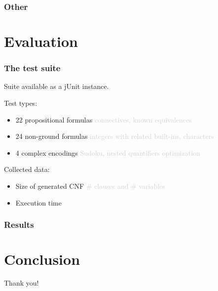 \documentclass[smaller,dvipsnames]{beamer}
\begin{document}
  \begin{frame}
    \frametitle{Other}
  \end{frame}

  \section{Evaluation}

  \begin{frame}
    \frametitle{The test suite}
    Suite available as a \alert{jUnit} instance.

    Test types:
    \begin{itemize}
      \item 22 propositional formulas \textcolor{lightgray}{connectives, known equivalences}
      \item 24 non-ground formulas \textcolor{lightgray}{integers with related built-ins, characters}
      \item 4 complex encodings \textcolor{lightgray}{Sudoku, nested quantifiers optimization}
    \end{itemize}
    Collected data:
    \begin{itemize}
      \item \alert{Size} of generated CNF \textcolor{lightgray}{\# clauses and \# variables}
      \item Execution \alert{time}
    \end{itemize}
  \end{frame}

  \begin{frame}
    \frametitle{Results}
  \end{frame}

  \section{Conclusion}


  \begin{frame}[standout]
    Thank you!
  \end{frame}
\end{document}
